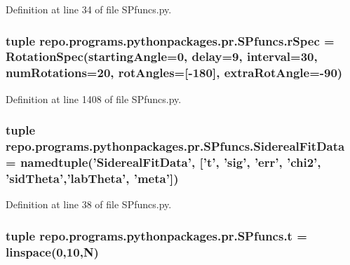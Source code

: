 Definition at line 34 of file S\-Pfuncs.\-py.

\hypertarget{namespacerepo_1_1programs_1_1pythonpackages_1_1pr_1_1SPfuncs_a0fa8a32d68b3b6a1486926b952bd3676}{
\subsubsection[{r\-Spec}]{\setlength{\rightskip}{0pt plus 5cm}tuple repo.\-programs.\-pythonpackages.\-pr.\-S\-Pfuncs.\-r\-Spec = {\bf Rotation\-Spec}(starting\-Angle=0, delay=9, interval=30, num\-Rotations=20, rot\-Angles=\mbox{[}-\/180\mbox{]}, extra\-Rot\-Angle=-\/90)}}\label{namespacerepo_1_1programs_1_1pythonpackages_1_1pr_1_1SPfuncs_a0fa8a32d68b3b6a1486926b952bd3676}


Definition at line 1408 of file S\-Pfuncs.\-py.

\hypertarget{namespacerepo_1_1programs_1_1pythonpackages_1_1pr_1_1SPfuncs_a8dd105859db0f7ebef805efb3c08dfb7}{
\subsubsection[{Sidereal\-Fit\-Data}]{\setlength{\rightskip}{0pt plus 5cm}tuple repo.\-programs.\-pythonpackages.\-pr.\-S\-Pfuncs.\-Sidereal\-Fit\-Data = namedtuple('Sidereal\-Fit\-Data', \mbox{[}'{\bf t}', 'sig', 'err', 'chi2', 'sid\-Theta','lab\-Theta', 'meta'\mbox{]})}}\label{namespacerepo_1_1programs_1_1pythonpackages_1_1pr_1_1SPfuncs_a8dd105859db0f7ebef805efb3c08dfb7}


Definition at line 38 of file S\-Pfuncs.\-py.

\hypertarget{namespacerepo_1_1programs_1_1pythonpackages_1_1pr_1_1SPfuncs_ae6715e84e2c13a885096710a851aba3a}{
\subsubsection[{t}]{\setlength{\rightskip}{0pt plus 5cm}tuple repo.\-programs.\-pythonpackages.\-pr.\-S\-Pfuncs.\-t = linspace(0,10,{\bf N})}}\label{namespacerepo_1_1programs_1_1pythonpackages_1_1pr_1_1SPfuncs_ae6715e84e2c13a885096710a851aba3a}


